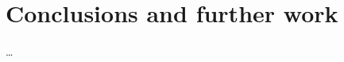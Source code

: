 \documentclass{masterthesis}
\begin{document}


\chapter{Conclusions and further work}
\dots

\nocite{*}



\appendix







\end{document}

